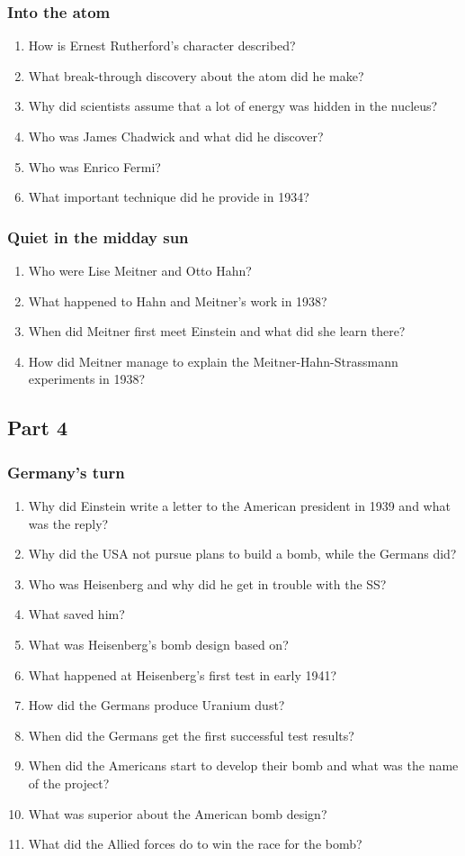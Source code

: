 \subsubsection*{Into the atom}
\begin{enumerate}  
\item How is Ernest Rutherford’s character described?
\item What break-through discovery about the atom did he make? 
\item Why did scientists assume that a lot of energy was hidden in the nucleus?
\item Who was James Chadwick and what did he discover?
\item Who was Enrico Fermi?
\item What important technique did he provide in 1934?
\end{enumerate}

\subsubsection*{Quiet in the midday sun}
\begin{enumerate}  
\item Who were Lise Meitner and Otto Hahn?
\item What happened to Hahn and Meitner’s work in 1938?
\item When did Meitner first meet Einstein and what did she learn there?
\item How did Meitner manage to explain the Meitner-Hahn-Strassmann experiments in 1938?
\end{enumerate}

\subsection*{Part 4}
\subsubsection*{Germany’s turn}
\begin{enumerate}  
\item Why did Einstein write a letter to the American president in 1939 and what was the reply?
\item Why did the USA not pursue plans to build a bomb, while the Germans did?
\item Who was Heisenberg and why did he get in trouble with the SS?
\item What saved him?
\item What was Heisenberg’s bomb design based on?
\item What happened at Heisenberg’s first test in early 1941?
\item How did the Germans produce Uranium dust?
\item When did the Germans get the first successful test results?
\item When did the Americans start to develop their bomb and what was the name of the project?
\item What was superior about the American bomb design?
\item What did the Allied forces do to win the race for the bomb?
\end{enumerate}

